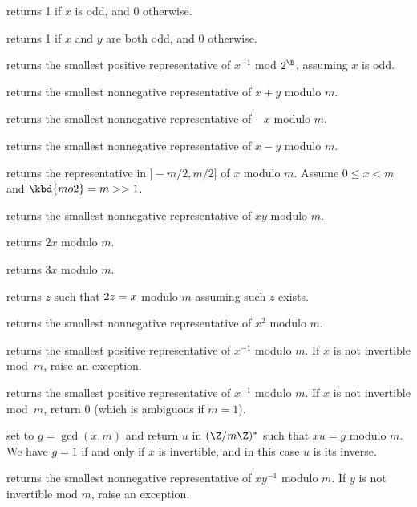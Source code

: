  returns 1 if $x$ is odd, and 0 otherwise.

 returns 1 if $x$ and $y$ are both odd,
and 0 otherwise.

 returns the smallest
positive representative of $x^{-1}$ mod $2^\B$, assuming $x$ is odd.

 returns the smallest
nonnegative representative of $x + y$ modulo $m$.

 returns the smallest
nonnegative representative of $-x$ modulo $m$.

 returns the smallest
nonnegative representative of $x - y$ modulo $m$.

 returns the representative
in $]-m/2,m/2]$ of $x$ modulo $m$. Assume $0 \leq x < m$ and
$\kbd{mo2}  = m >> 1$.

 returns the smallest
nonnegative representative of $x y$ modulo $m$.

 returns $2x$ modulo $m$.

 returns $3x$ modulo $m$.

 returns $z$ such that $2\*z = x$ modulo
$m$ assuming such $z$ exists.

 returns the smallest nonnegative
representative of $x^2$ modulo $m$.

 returns the smallest
positive representative of $x^{-1}$ modulo $m$. If $x$ is not invertible
mod~$m$, raise an exception.

 returns the smallest
positive representative of $x^{-1}$ modulo $m$. If $x$ is not invertible
mod~$m$, return $0$ (which is ambiguous if $m=1$).

 set  to
$g = \gcd(x,m)$ and return $u$ in $(\Z/m\Z)^*$ such that $x u = g$ modulo $m$.
We have $g = 1$ if and only if $x$ is invertible, and in this case $u$
is its inverse.

 returns the smallest
nonnegative representative of $x y^{-1}$ modulo $m$. If $y$ is not invertible
mod $m$, raise an exception.


